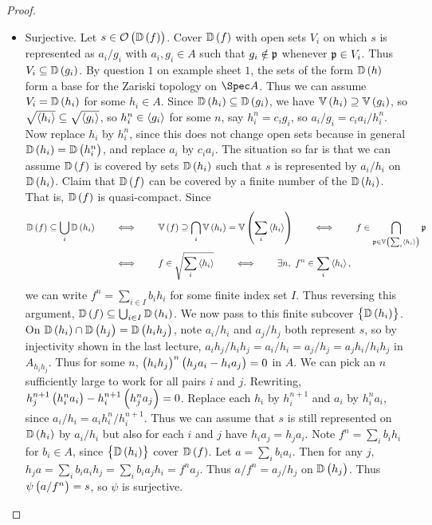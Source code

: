 \begin{proof}
\begin{itemize}
\item Surjective. Let $ s \in \OOO\br{\DD\br{f}} $. Cover $ \DD\br{f} $ with open sets $ V_i $ on which $ s $ is represented as $ a_i / g_i $ with $ a_i, g_i \in A $ such that $ g_i \notin \mathfrak{p} $ whenever $ \mathfrak{p} \in V_i $. Thus $ V_i \subseteq \DD\br{g_i} $. By question $ 1 $ on example sheet $ 1 $, the sets of the form $ \DD\br{h} $ form a base for the Zariski topology on $ \Spec A $. Thus we can assume $ V_i = \DD\br{h_i} $ for some $ h_i \in A $. Since $ \DD\br{h_i} \subseteq \DD\br{g_i} $, we have $ \VV\br{h_i} \supseteq \VV\br{g_i} $, so $ \sqrt{\left\langle h_i \right\rangle} \subseteq \sqrt{\left\langle g_i \right\rangle} $, so $ h_i^n \in \left\langle g_i \right\rangle $ for some $ n $, say $ h_i^n = c_ig_i $, so $ a_i / g_i = c_ia_i / h_i^n $. Now replace $ h_i $ by $ h_i^n $, since this does not change open sets because in general $ \DD\br{h_i} = \DD\br{h_i^n} $, and replace $ a_i $ by $ c_ia_i $. The situation so far is that we can assume $ \DD\br{f} $ is covered by sets $ \DD\br{h_i} $ such that $ s $ is represented by $ a_i / h_i $ on $ \DD\br{h_i} $. Claim that $ \DD\br{f} $ can be covered by a finite number of the $ \DD\br{h_i} $. That is, $ \DD\br{f} $ is quasi-compact. Since
\begin{align*}
\DD\br{f} \subseteq \bigcup_i \DD\br{h_i} \qquad
& \iff \qquad \VV\br{f} \supseteq \bigcap_i \VV\br{h_i} = \VV\br{\sum_i \abr{h_i}}
\qquad \iff \qquad f \in \bigcap_{\ppp \in \VV\br{\sum_i \abr{h_i}}} \ppp \\
& \iff \qquad f \in \sqrt{\sum_i \abr{h_i}}
\qquad \iff \qquad \exists n, \ f^n \in \sum_i \abr{h_i},
\end{align*}
we can write $ f^n = \sum_{i \in I} b_ih_i $ for some finite index set $ I $. Thus reversing this argument, $ \DD\br{f} \subseteq \bigcup_{i \in I} \DD\br{h_i} $. We now pass to this finite subcover $ \cbr{\DD\br{h_i}} $. On $ \DD\br{h_i} \cap \DD\br{h_j} = \DD\br{h_ih_j} $, note $ a_i / h_i $ and $ a_j / h_j $ both represent $ s $, so by injectivity shown in the last lecture, $ a_ih_j / h_ih_j = a_i / h_i = a_j / h_j = a_jh_i / h_ih_j $ in $ A_{h_ih_j} $. Thus for some $ n $, $ \br{h_ih_j}^n\br{h_ja_i - h_ia_j} = 0 $ in $ A $. We can pick an $ n $ sufficiently large to work for all pairs $ i $ and $ j $. Rewriting, $ h_j^{n + 1}\br{h_i^na_i} - h_i^{n + 1}\br{h_j^na_j} = 0 $. Replace each $ h_i $ by $ h_i^{n + 1} $ and $ a_i $ by $ h_i^na_i $, since $ a_i / h_i = a_ih_i^n / h_i^{n + 1} $. Thus we can assume that $ s $ is still represented on $ \DD\br{h_i} $ by $ a_i / h_i $ but also for each $ i $ and $ j $ have $ h_ia_j = h_ja_i $. Note $ f^n = \sum_ib_ih_i $ for $ b_i \in A $, since $ \cbr{\DD\br{h_i}} $ cover $ \DD\br{f} $. Let $ a = \sum_i b_ia_i $. Then for any $ j $, $ h_ja = \sum_i b_ia_ih_j = \sum_i b_ia_jh_i = f^na_j $. Thus $ a / f^n = a_j / h_j $ on $ \DD\br{h_j} $. Thus $ \psi\br{a / f^n} = s $, so $ \psi $ is surjective.
\end{itemize}
\end{proof}

